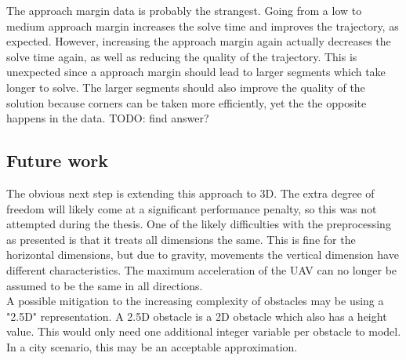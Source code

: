 The approach margin data is probably the strangest. Going from a low to medium approach margin increases the solve time and improves the trajectory, as expected. However, increasing the approach margin again actually decreases the solve time again, as well as reducing the quality of the trajectory. This is unexpected since a approach margin should lead to larger segments which take longer to solve. The larger segments should also improve the quality of the solution because corners can be taken more efficiently, yet the the opposite happens in the data. TODO: find answer?



\subsection{Future work}


%
%


The obvious next step is extending this approach to 3D. The extra degree of freedom will likely come at a significant performance penalty, so this was not attempted during the thesis. One of the likely difficulties with the preprocessing as presented is that it treats all dimensions the same. This is fine for the horizontal dimensions, but due to gravity, movements the vertical dimension have different characteristics. The maximum acceleration of the UAV can no longer be assumed to be the same in all directions.\\
A possible mitigation to the increasing complexity of obstacles may be using a "2.5D" representation. A 2.5D obstacle is a 2D obstacle which also has a height value. This would only need one additional integer variable per obstacle to model. In a city scenario, this may be an acceptable approximation. \\

